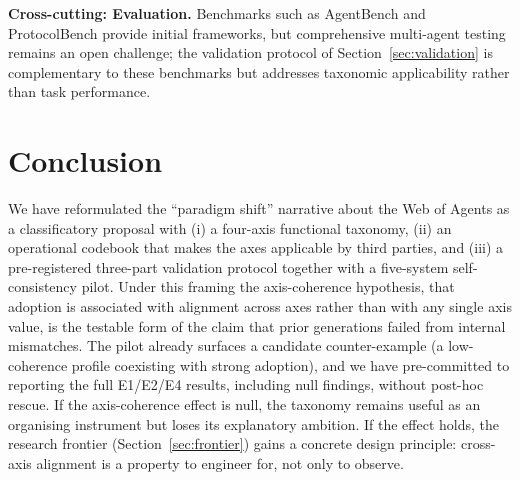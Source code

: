 \documentclass[10pt,twocolumn]{article}
\begin{document}
\textbf{Cross-cutting: Evaluation.}  Benchmarks such as AgentBench and ProtocolBench provide initial frameworks, but comprehensive multi-agent testing remains an open challenge; the validation protocol of Section~\ref{sec:validation} is complementary to these benchmarks but addresses taxonomic applicability rather than task performance.


\section{Conclusion}\label{sec:conclusion}

We have reformulated the ``paradigm shift'' narrative about the Web of Agents as a classificatory proposal with (i) a four-axis functional taxonomy, (ii) an operational codebook that makes the axes applicable by third parties, and (iii) a pre-registered three-part validation protocol together with a five-system self-consistency pilot.  Under this framing the axis-coherence hypothesis, that adoption is associated with alignment across axes rather than with any single axis value, is the testable form of the claim that prior generations failed from internal mismatches.  The pilot already surfaces a candidate counter-example (a low-coherence profile coexisting with strong adoption), and we have pre-committed to reporting the full E1/E2/E4 results, including null findings, without post-hoc rescue.  If the axis-coherence effect is null, the taxonomy remains useful as an organising instrument but loses its explanatory ambition.  If the effect holds, the research frontier (Section~\ref{sec:frontier}) gains a concrete design principle: cross-axis alignment is a property to engineer for, not only to observe.




\end{document}
